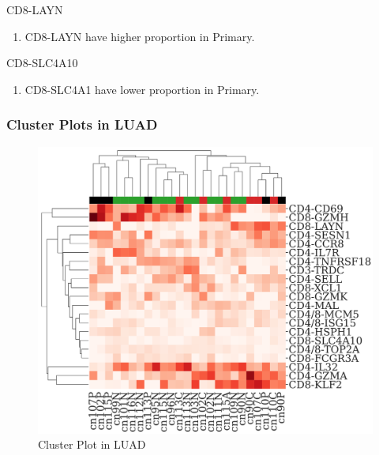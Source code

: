 \documentclass{beamer}
\begin{document}
\begin{frame}[allowframebreaks]
        \begin{block}{CD8-LAYN}
            \begin{enumerate}
                \item CD8-LAYN have higher proportion in Primary.
            \end{enumerate}
        \end{block}

        \begin{block}{CD8-SLC4A10}
            \begin{enumerate}
                \item CD8-SLC4A1 have lower proportion in Primary.
            \end{enumerate}
        \end{block}
    \end{frame}

    \begin{frame}
        \frametitle{Cluster Plots in LUAD}

        \begin{figure}
            \includegraphics[height=0.6 \textheight]{figures/BisqueRNA/clustermap/STAR.ADC.GSE162498.cluster.pdf}
            \caption{Cluster Plot in LUAD}
        \end{figure}
    \end{frame}
\end{document}
